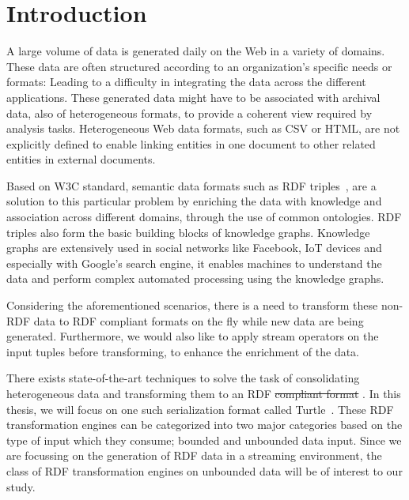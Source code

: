 \chapter{Introduction}
\label{chap:intro}

A large volume of data is generated daily on the Web in a variety of domains. These
data are often structured according to an organization's specific needs or formats: Leading to
a difficulty in integrating the data across the different applications.
These generated data might have to be associated with archival data, also of heterogeneous formats,
to provide a coherent view required by analysis tasks. Heterogeneous Web data formats, such as CSV or HTML, are not explicitly
defined to enable linking entities in one document to other related entities in external documents.

Based on W3C standard, semantic data formats such as RDF triples~\cite{intro_rdf}, are a solution to
this particular problem by enriching the data with knowledge and association across
different domains, through the use of common ontologies. RDF triples also form the basic building blocks of knowledge graphs.
Knowledge graphs are extensively used in social networks like Facebook\cite{facebook_linked_data}, IoT devices\cite{graph_of_things} and especially with Google's search
engine\cite{google_kg}, it enables machines to understand the data and perform complex automated processing
using the knowledge graphs. 

Considering the aforementioned scenarios, there is a need to transform these non-RDF data to RDF compliant formats on the fly while
new data are being generated. Furthermore, we would also like to apply stream operators on the input tuples
before transforming, to enhance the enrichment of the data.

There exists state-of-the-art techniques to solve the task of consolidating heterogeneous data
and transforming them to an RDF \sout{compliant format} . In this thesis, we will focus on one such serialization format called Turtle~\cite{turtle_syntax}.
These RDF transformation engines can be categorized into two major categories based on the type of input
which they consume; bounded and unbounded data input. Since we are focussing on the generation of RDF data
in a streaming environment, the class of RDF transformation engines on unbounded data will be of interest to our study.

